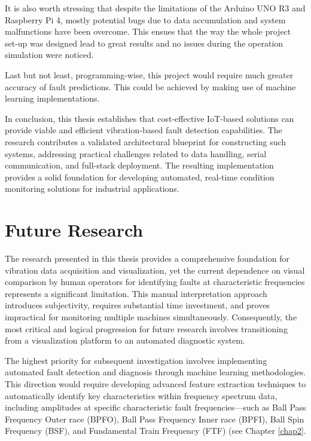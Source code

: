 {It is also worth stressing that despite the limitations of the Arduino UNO R3 and Raspberry Pi 4, mostly potential bugs due to data accumulation and system malfunctions have been overcome. This ensues that the way the whole project set-up was designed lead to great results and no issues during the operation simulation were noticed.

Last but not least, programming-wise, this project would require much greater accuracy of fault predictions. This could be achieved by making use of machine learning implementations.

In conclusion, this thesis establishes that cost-effective IoT-based solutions can provide viable and efficient vibration-based fault detection capabilities. The research contributes a validated architectural blueprint for constructing such systems, addressing practical challenges related to data handling, serial communication, and full-stack deployment. The resulting implementation provides a solid foundation for developing automated, real-time condition monitoring solutions for industrial applications.

\section{Future Research}

The research presented in this thesis provides a comprehensive foundation for vibration data acquisition and visualization, yet the current dependence on visual comparison by human operators for identifying faults at characteristic frequencies represents a significant limitation. This manual interpretation approach introduces subjectivity, requires substantial time investment, and proves impractical for monitoring multiple machines simultaneously. Consequently, the most critical and logical progression for future research involves transitioning from a visualization platform to an automated diagnostic system.

The highest priority for subsequent investigation involves implementing automated fault detection and diagnosis through machine learning methodologies. This direction would require developing advanced feature extraction techniques to automatically identify key characteristics within frequency spectrum data, including amplitudes at specific characteristic fault frequencies—such as Ball Pass Frequency Outer race (BPFO), Ball Pass Frequency Inner race (BPFI), Ball Spin Frequency (BSF), and Fundamental Train Frequency (FTF) (see Chapter \ref{chap2}.

}
